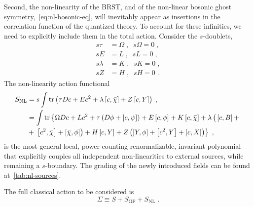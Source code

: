 \documentclass[../main.tex]{subfiles}
\begin{document}
Second, the non-linearity of the BRST, and of the non-linear bosonic ghost symmetry,~\eqref{eq:nl-bosonic-eq}, will inevitably appear as insertions in the correlation function of the quantized theory. To account for these infinities, we need to explicitly include them in the total action. Consider the $ s $-doublets,
\begin{subequations}%
  \label{eq:nl-s-doublets}
  \begin{align}
    s\tau    & = \Omega \;, \;\; s\Omega   = 0 \;, \\
    sE       & = L \;, \;\; sL        = 0 \;,      \\
    s\lambda & = K \;, \;\; sK        = 0 \;,      \\
    sZ       & = H \;, \;\; sH        = 0 \;.
  \end{align}
\end{subequations}
The non-linearity action functional
\begin{subequations}%
  \label{eq:nl-action}
  \begin{align}
    S_{\text{NL}} & = s \int \operatorname{tr} \left( \tau Dc + E c^2 + \lambda \left[ c,\bar\chi \right] + Z \left[ c,Y \right] \right) \;, \label{eq:nl-action-1}                                                                                           \\
                  & = \int \operatorname{tr} \left\{ \Omega Dc + Lc^2 + \tau \left( D\phi + \left[ c,\psi \right] \right) + E \left[ c,\phi \right] + K \left[ c,\bar\chi \right] + \lambda \left(\vphantom{^2}\left[ c,B \right] + \right. \right. \nonumber \\
                  & + \left. \left. \left[ c^2,\bar\chi \right] + \left[ \bar\chi,\phi \right] \right) + H \left[ c, Y \right] + Z \left( \left[ Y, \phi \right] + \left[ c^2, Y \right] + \left[ c, X \right] \right) \right\} \;,
  \end{align}
\end{subequations}
is the most general local, power-counting renormalizable, invariant polynomial that explicitly couples all independent non-linearities to external sources, while remaining a $ s $-boundary. The grading of the newly introduced fields can be found at~\ref{tab:nl-sources}.

The full classical action to be considered is
\begin{equation}
  \label{eq:total-action}
  \Sigma \equiv S + S_{\text{GF}} + S_{ \text{NL} }\; .
\end{equation}
\end{document}
